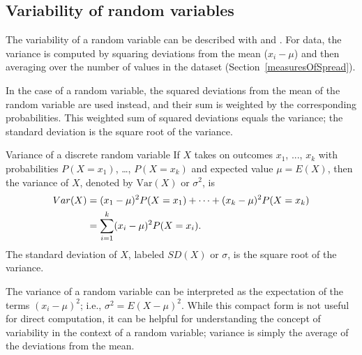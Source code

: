 

\textD{\newpage}


\subsection{Variability of random variables} 
\label{section:varianceRandomVariable}

The variability of a random variable can be described with  and . For data, the variance is computed by squaring deviations from the mean ($x_i - \mu$) and then averaging over the number of values in the dataset (Section~\ref{measuresOfSpread}). 

In the case of a random variable, the squared deviations from the mean of the random variable are used instead, and their sum is weighted by the corresponding probabilities. This weighted sum of squared deviations equals the variance; the standard deviation is the square root of the variance.

\begin{onebox}{Variance of a discrete random variable}
If $X$ takes on outcomes $x_1$, ..., $x_k$ with probabilities $P(X=x_1)$, \dots, $P(X=x_k)$ and expected value $\mu=E(X)$, then the variance of $X$, denoted by $\text{Var}(X)$ or $\sigma^2$, is
\begin{align}
Var(X) &= (x_1-\mu)^2 P(X=x_1) + \cdots \notag + (x_k-\mu)^2 P(X=x_k) \notag \\
&= \sum_{i=1}^{k} (x_i - \mu)^2 P(X=x_i).
\end{align}
The standard deviation of $X$, labeled $SD(X)$ or $\sigma$, is the square root of the variance.
\end{onebox}%

The variance of a random variable can be interpreted as the expectation of the terms $(x_i - \mu)^2$; i.e., $\sigma^2 = E(X - \mu)^2$. While this compact form is not useful for direct computation, it can be helpful for understanding the concept of variability in the context of a random variable; variance is simply the average of the deviations from the mean.


